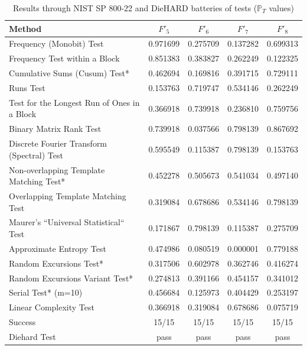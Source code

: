 \begin{table}[t]
\renewcommand{\arraystretch}{1.3}
\caption{Results through NIST SP 800-22 and DieHARD batteries of tests ($\mathbb{P}_T$ values)}
\label{The passing rate34}
\centering
  \begin{tabular}{|l@{}|c@{}|c@{}|c@{}|c@{}|}
    \hline
Method & $F'_5$ & $F'_6$ & $F'_7$ & $F'_8$\\ \hline\hline


Frequency (Monobit) Test            &    0.971699 &  0.275709 &  0.137282 &    0.699313 \\ \hline
Frequency Test within a Block             &   0.851383 &  0.383827 &  0.262249 &    0.122325 \\ \hline
Cumulative Sums (Cusum) Test*             &   0.462694 &  0.169816 &  0.391715 &    0.729111\\ \hline
Runs Test                    &    0.153763 &  0.719747 &  0.534146 &    0.262249 \\ \hline
Test for the Longest Run of Ones in a Block     &   0.366918 &  0.739918 &  0.236810 &    0.759756 \\ \hline
Binary Matrix Rank Test                &  0.739918 &  0.037566 &  0.798139 &    0.867692 \\ \hline
Discrete Fourier Transform (Spectral) Test     &     0.595549 &  0.115387 &  0.798139 &    0.153763 \\ \hline
Non-overlapping Template Matching Test*        &    0.452278 &  0.505673 &  0.541034 &    0.497140 \\ \hline
Overlapping Template Matching Test        &    0.319084 &  0.678686 &  0.534146 &    0.798139 \\ \hline
Maurer's ``Universal Statistical`` Test         &     0.171867 &  0.798139 &  0.115387 &    0.275709 \\ \hline
Approximate Entropy Test             &   0.474986 &  0.080519 &  0.000001 &    0.779188\\ \hline
Random Excursions Test*                &    0.317506 &  0.602978 &  0.362746 &    0.416274 \\ \hline
Random Excursions Variant Test*            &    0.274813 &  0.391166 &  0.454157 &    0.341012 \\ \hline
Serial Test* (m=10)                &    0.456684 &  0.125973 &  0.404429 &    0.253197 \\ \hline
Linear Complexity Test                & 0.366918 &  0.319084 &  0.678686 &    0.075719 \\ \hline
Success                     &15/15&15/15&15/15&15/15  \\ \hline\hline
Diehard Test               &pass&pass&pass&pass\\ \hline
  \end{tabular}
\end{table}